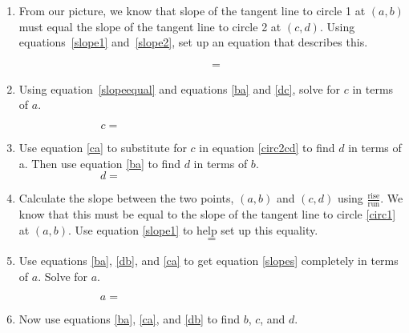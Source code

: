 \documentclass[11pt]{article}
\begin{document}
\begin{enumerate}
  \newpage
  
\item From our picture, we know that slope of the tangent line to
  circle 1 at $(a,b)$ must equal the slope of the tangent line to
  circle 2 at $(c,d)$. Using equations~\ref{slope1} and~\ref{slope2},
  set up an equation that describes this.

  \begin{align}
    \label{slopeequal}
    &=
  \end{align}



\item Using equation~\ref{slopeequal} and equations \ref{ba} and \ref{dc},
  solve for $c$ in terms of $a$.
  
  \vfill
  
  \begin{equation}\label{ca}
    c = \hspace{3in}
  \end{equation}
  
  \newpage
  
\item Use equation \ref{ca} to substitute for $c$ in equation
  \ref{circ2cd} to find $d$ in terms of a.  Then use equation \ref{ba}
  to find $d$ in terms of $b$.
  \vfill
  \begin{equation}\label{db}
    d =\hspace{3in}
  \end{equation}
\item Calculate the slope between the two points, $(a,b)$ and $(c,d)$
  using $\frac{\text{rise}}{\text{run}}$.  We know that this must be
  equal to the slope of the tangent line to circle \ref{circ1} at
  $(a,b)$.  Use equation \ref{slope1} to help set up this equality.
  \vfill
  \begin{equation}\label{slopes}
    =
  \end{equation}
  \newpage
  
\item Use equations \ref{ba}, \ref{db}, and \ref{ca} to get equation
  \ref{slopes} completely in terms of $a$.  Solve for $a$.
  
  \vfill
  
  \begin{equation}\label{a}
    a = \hspace{3in}
  \end{equation}
  
\item Now use equations \ref{ba}, \ref{ca}, and \ref{db} to find
  $b$, $c$, and $d$.
  
  \vfill
  
\end{enumerate}
\end{document}
